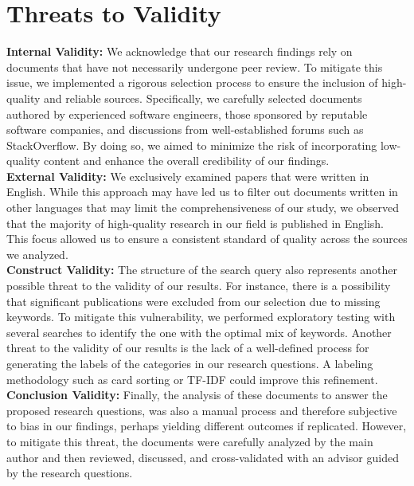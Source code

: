 \documentclass[
	msc, %
	english %
]{../ppgccufmg}
\begin{document}
  	\section{Threats to Validity}\label{sec:ch3-threats}

        \noindent\textbf{Internal Validity:} We acknowledge that our research findings rely on documents that have not necessarily undergone peer review. To mitigate this issue, we implemented a rigorous selection process to ensure the inclusion of high-quality and reliable sources. Specifically, we carefully selected documents authored by experienced software engineers, those sponsored by reputable software companies, and discussions from well-established forums such as StackOverflow. By doing so, we aimed to minimize the risk of incorporating low-quality content and enhance the overall credibility of our findings.\\

        \noindent\textbf{External Validity:} We exclusively examined papers that were written in English. While this approach may have led us to filter out documents written in other languages that may limit the comprehensiveness of our study, we observed that the majority of high-quality research in our field is published in English. This focus allowed us to ensure a consistent standard of quality across the sources we analyzed.\\

        \noindent\textbf{Construct Validity:} The structure of the search query also represents another possible threat to the validity of our results. For instance, there is a possibility that significant publications were excluded from our selection due to missing keywords. To mitigate this vulnerability, we performed exploratory testing with several searches to identify the one with the optimal mix of keywords. Another threat to the validity of our results is the lack of a well-defined process for generating the labels of the categories in our research questions. A labeling methodology such as card sorting or TF-IDF could improve this refinement.\\

        \noindent\textbf{Conclusion Validity:} Finally, the analysis of these documents to answer the proposed research questions, was also a manual process and therefore subjective to bias in our findings, perhaps yielding different outcomes if replicated. However, to mitigate this threat, the documents were carefully analyzed by the main author and then reviewed, discussed, and cross-validated with an advisor guided by the research questions.
        
\end{document}
